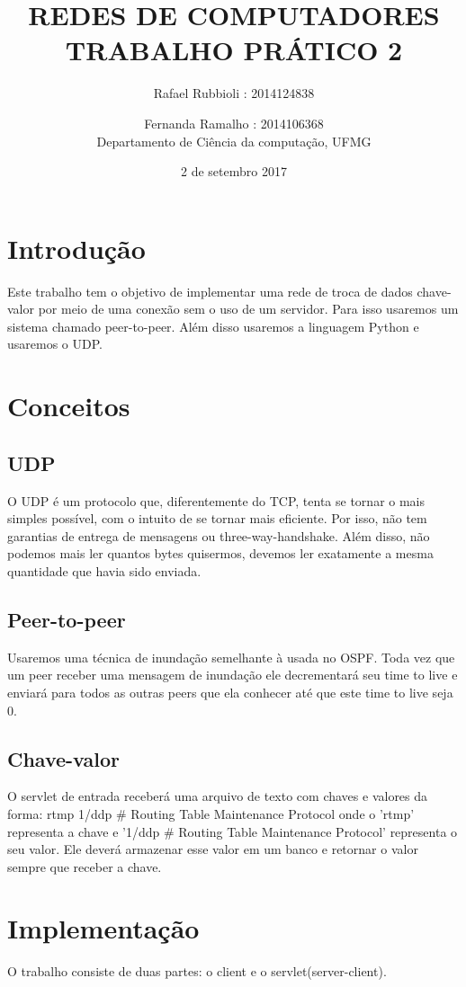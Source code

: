 \documentclass[10pt]{article}
\title{\LARGE \textbf{\uppercase{REDES DE COMPUTADORES\\Trabalho prático 2}} }
\date{2 de setembro 2017}
\author{Rafael Rubbioli : 2014124838\\
\and Fernanda Ramalho : 2014106368 \\ Departamento de Ciência da computação, UFMG}
\begin{document}
	\maketitle
	\section{Introdução}
		Este trabalho tem o objetivo de implementar uma rede de troca de dados chave-valor por meio de uma conexão sem o uso de um servidor. Para isso usaremos um sistema chamado peer-to-peer. Além disso usaremos a linguagem Python e usaremos o UDP.
	\section{Conceitos}
		\subsection{UDP}
			O UDP é um protocolo que, diferentemente do TCP, tenta se tornar o mais simples possível, com o intuito de se tornar mais eficiente. Por isso, não tem garantias de entrega de mensagens ou three-way-handshake. Além disso, não podemos mais ler quantos bytes quisermos, devemos ler exatamente a mesma quantidade que havia sido enviada.
		\subsection{Peer-to-peer} 
			Usaremos uma técnica de inundação semelhante à usada no OSPF. Toda vez que um peer receber uma mensagem de inundação ele decrementará seu time to live e enviará para todos as outras peers que ela conhecer até que este time to live seja 0.
		\subsection{Chave-valor}
			O servlet de entrada receberá uma arquivo de texto com chaves e valores da forma:
\newline			rtmp           1/ddp      \# Routing Table Maintenance Protocol
\newline onde o 'rtmp' representa a chave e '1/ddp      \# Routing Table Maintenance Protocol' representa o seu valor. Ele deverá armazenar esse valor em um banco e retornar o valor sempre que receber a chave.
	\section{Implementação}
		O trabalho consiste de duas partes: o client e o servlet(server-client).
\end{document}
